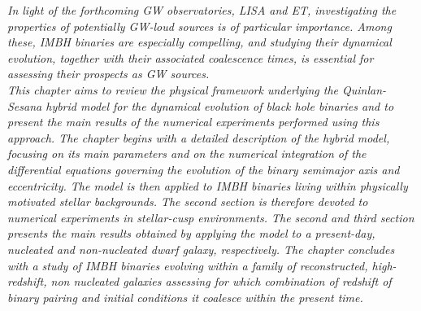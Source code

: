 \documentclass[12pt,twoside,openany]{book}
\begin{document}
\begin{center}
\begin{minipage}{0.65\textwidth}
\centering
\textit{In light of the forthcoming GW observatories, LISA and ET, investigating the properties of potentially GW-loud sources is of particular importance. Among these, IMBH binaries are especially compelling, and studying their dynamical evolution, together with their associated coalescence times, is essential for assessing their prospects as GW sources.\\This chapter aims to review the physical framework underlying the Quinlan-Sesana hybrid model for the dynamical evolution of black hole binaries and to present the main results of the numerical experiments performed using this approach. The chapter begins with a detailed description of the hybrid model, focusing on its main parameters and on the numerical integration of the differential equations governing the evolution of the binary semimajor axis and eccentricity. The model is then applied to IMBH binaries living within physically motivated stellar backgrounds. The second section is therefore devoted to numerical experiments in stellar-cusp environments. The second and third section presents the main results obtained by applying the model to a present-day, nucleated and non-nucleated dwarf galaxy, respectively. The chapter concludes with a study of IMBH binaries evolving within a family of reconstructed, high-redshift, non nucleated galaxies assessing for which combination of redshift of binary pairing and initial conditions it coalesce within the present time.}
\end{minipage}
\end{center}

\vspace*{\fill}







\newpage
\end{document}
